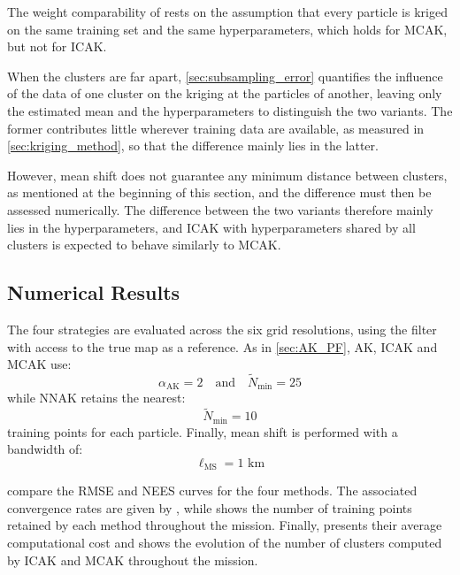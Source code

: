\begin{remark}
	The weight comparability of  rests on the assumption that every particle is kriged on the same training set and the same hyperparameters, which holds for MCAK, but not for ICAK.

	When the clusters are far apart, \cref{sec:subsampling_error} quantifies the influence of the data of one cluster on the kriging at the particles of another, leaving only the estimated mean and the hyperparameters to distinguish the two variants. The former contributes little wherever training data are available, as measured in \cref{sec:kriging_method}, so that the difference mainly lies in the latter.

	However, mean shift does not guarantee any minimum distance between clusters, as mentioned at the beginning of this section, and the difference must then be assessed numerically. The difference between the two variants therefore mainly lies in the hyperparameters, and ICAK with hyperparameters shared by all clusters is expected to behave similarly to MCAK.
\end{remark}

\subsection{Numerical Results}

The four strategies are evaluated across the six grid resolutions, using the filter with access to the true map as a reference. As in \cref{sec:AK_PF}, AK, ICAK and MCAK use:
\begin{equation}
	\alpha_{\mathrm{AK}}=2\quad\text{and}\quad\tilde{N}_{\min}=25
\end{equation}
while NNAK retains the nearest:
\begin{equation}
	\tilde{N}_{\min}=10
\end{equation}
training points for each particle. Finally, mean shift is performed with a bandwidth of:
\begin{equation}
	\ell_{\mathrm{MS}}=1\text{ km}
\end{equation}

 compare the RMSE and NEES curves for the four methods. The associated convergence rates are given by , while  shows the number of training points retained by each method throughout the mission. Finally,  presents their average computational cost and  shows the evolution of the number of clusters computed by ICAK and MCAK throughout the mission.

